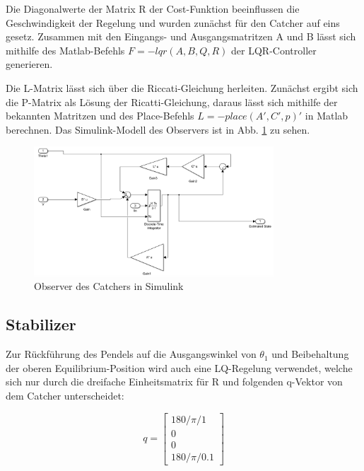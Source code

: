Die Diagonalwerte der Matrix R der Cost-Funktion beeinflussen die Geschwindigkeit der Regelung und wurden zunächst für den Catcher auf eins gesetz.
Zusammen mit den Eingangs- und Ausgangsmatritzen A und B lässt sich mithilfe des Matlab-Befehls $F = -lqr(A,B,Q,R)$ der LQR-Controller generieren.

Die L-Matrix lässt sich über die Riccati-Gleichung \cite{Werner.2013} herleiten. Zunächst ergibt sich die P-Matrix als Lösung der Ricatti-Gleichung, daraus lässt sich mithilfe der bekannten Matritzen und des Place-Befehls $L=-place(A',C',p)'$ in Matlab berechnen.
Das Simulink-Modell des Observers ist in Abb. \ref{fig.obs_catcher} zu sehen.

\begin{figure}[htbp]
	\centering	
	\label{fig.obs_catcher}
	\includegraphics[width=0.8\textwidth]{Grafiken/simulink_observer_catcher.png}
	\caption{Observer des Catchers in Simulink}
\end{figure}

\subsection{Stabilizer}
\label{stabilizer} 

Zur Rückführung des Pendels auf die Ausgangswinkel von $\theta_1$ und Beibehaltung der oberen Equilibrium-Position wird auch eine LQ-Regelung verwendet, welche sich nur durch die dreifache Einheitsmatrix für R und folgenden q-Vektor von dem Catcher unterscheidet:

\begin{equation}
q =\begin{bmatrix}
         180/\pi/1 \\
         0\\
         0\\
         180/\pi/0.1
        \end{bmatrix}
\end{equation}

